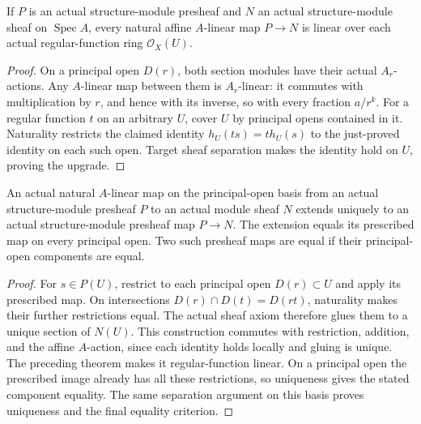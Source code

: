 \begin{theorem}
\label{sc0-canonical-port:geom:affine-coordinate-linear-map-upgrade}
\leanok
If \(P\) is an actual structure-module presheaf and
\(N\) an actual structure-module sheaf on
\(\operatorname{Spec}A\), every natural affine
\(A\)-linear map \(P\to N\) is linear over each actual
regular-function ring \(\mathcal O_X(U)\).
\end{theorem}
\begin{proof}
On a principal open \(D(r)\), both section modules have
their actual \(A_r\)-actions. Any \(A\)-linear map
between them is \(A_r\)-linear: it commutes with
multiplication by \(r\), and hence with its inverse,
so with every fraction \(a/r^k\).
For a regular function \(t\) on an arbitrary \(U\),
cover \(U\) by principal opens contained in it.
Naturality restricts the claimed identity
\(h_U(ts)=t h_U(s)\) to the just-proved identity on
each such open. Target sheaf separation makes the
identity hold on \(U\), proving the upgrade.
\end{proof}

\begin{theorem}
\label{sc0-canonical-port:geom:affine-principal-basis-extension}
\leanok
An actual natural \(A\)-linear map on the principal-open
basis from an actual structure-module presheaf \(P\)
to an actual module sheaf \(N\) extends uniquely to an
actual structure-module presheaf map \(P\to N\).
The extension equals its prescribed map on every
principal open. Two such presheaf maps are equal if
their principal-open components are equal.
\end{theorem}
\begin{proof}
For \(s\in P(U)\), restrict to each principal open
\(D(r)\subset U\) and apply its prescribed map.
On intersections \(D(r)\cap D(t)=D(rt)\), naturality
makes their further restrictions equal. The actual
sheaf axiom therefore glues them to a unique section
of \(N(U)\). This construction commutes with
restriction, addition, and the affine \(A\)-action,
since each identity holds locally and gluing is unique.
The preceding theorem makes it regular-function linear.
On a principal open the prescribed image already has
all these restrictions, so uniqueness gives the stated
component equality. The same separation argument on
this basis proves uniqueness and the final equality
criterion.
\end{proof}

